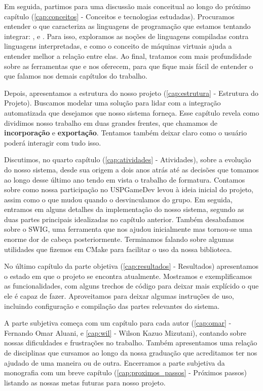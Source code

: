 \documentclass[11pt,twoside,a4paper]{book}
\begin{document}
Em seguida, partimos para uma discussão mais conceitual ao longo do próximo
capítulo (\ref{cap:conceitos} - Conceitos e tecnologias estudadas).
Procuramos entender o que caracteriza as linguagens de programação que estamos
tentando integrar: \CXX{},  e . Para isso, exploramos
as noções de linguagens compiladas contra linguagens interpretadas, e como
o conceito de máquinas virtuais ajuda a entender melhor a relação entre elas.
Ao final, tratamos com mais profundidade sobre as ferramentas que  e
 nos oferecem, para que fique mais fácil de entender o que
falamos nos demais capítulos do trabalho.

Depois, apresentamos a estrutura do nosso projeto (\ref{cap:estrutura} -
Estrutura do Projeto). Buscamos modelar uma solução para lidar com a
integração automatizada que desejamos que nosso sistema forneça. Esse
capítulo revela como dividimos nosso trabalho em duas grandes frentes,
que chamamos de \textbf{incorporação} e \textbf{exportação}. Tentamos
também deixar claro como o usuário poderá interagir com tudo isso.

Discutimos, no quarto capítulo (\ref{cap:atividades} - Atividades), sobre a
evolução do nosso sistema, desde sua origem a dois anos atrás até as decisões
que tomamos ao longo desse último ano tendo em vista o trabalho de formatura.
Contamos sobre como nossa participação no USPGameDev levou à ideia inicial
do projeto, assim como o que mudou quando o desvinculamos do grupo. Em seguida,
entramos em alguns detalhes da implementação do nosso sistema, segundo
as duas partes principais idealizadas no capítulo anterior. Também desabafamos sobre
o SWIG, uma ferramenta que nos ajudou inicialmente mas tornou-se uma
enorme dor de cabeça posteriormente. Terminamos falando sobre algumas utilidades
que fizemos em CMake para facilitar o uso da nossa biblioteca.

No último capítulo da parte objetiva (\ref{cap:resultados} - Resultados)
apresentamos o estado em que o projeto se encontra atualmente. Mostramos e
exemplificamos as funcionalidades, com alguns trechos de código para
deixar mais explícido o que ele é capaz de fazer. Aproveitamos para deixar
algumas instruções de uso, incluindo configuração e compilação das partes
relevantes do sistema.

A parte subjetiva começa com um capítulo para cada autor (\ref{cap:omar} - Fernando
Omar Aluani, e \ref{cap:wil} - Wilson Kazuo Mizutani), contando sobre nossas
dificuldades e frustrações no trabalho. Também apresentamos uma relação de
disciplinas que cursamos ao longo da nossa graduação que acreditamos ter nos
ajudado de uma maneira ou de outra. Encerramos a parte subjetiva da monografia
com um breve capítulo (\ref{cap:proximos_passos} - Próximos passos) listando
as nossas metas futuras para nosso projeto.
\end{document}
